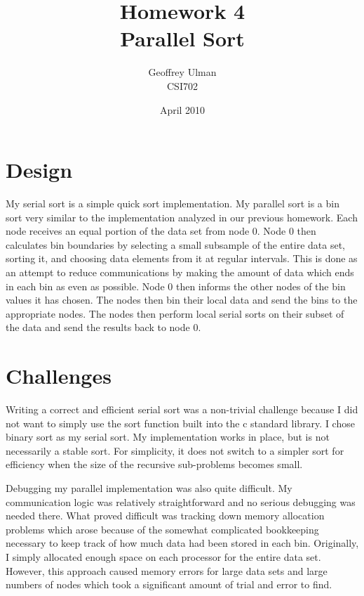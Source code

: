 \documentclass{article}
\begin{document}
\title{Homework 4\\
       Parallel Sort}
\author{Geoffrey Ulman\\
        CSI702}
\date{April 2010}
\maketitle

\section{Design}
My serial sort is a simple quick sort implementation. My parallel sort is a bin sort very similar to the implementation analyzed in our previous homework. Each node receives an equal portion of the data set from node 0. Node 0 then calculates bin boundaries by selecting a small subsample of the entire data set, sorting it, and choosing data elements from it at regular intervals. This is done as an attempt to reduce communications by making the amount of data which ends in each bin as even as possible. Node 0 then informs the other nodes of the bin values it has chosen. The nodes then bin their local data and send the bins to the appropriate nodes. The nodes then perform local serial sorts on their subset of the data and send the results back to node 0.

\section{Challenges}
Writing a correct and efficient serial sort was a non-trivial challenge because I did not want to simply use the sort function built into the c standard library. I chose binary sort as my serial sort. My implementation works in place, but is not necessarily a stable sort. For simplicity, it does not switch to a simpler sort for efficiency when the size of the recursive sub-problems becomes small.

Debugging my parallel implementation was also quite difficult. My communication logic was relatively straightforward and no serious debugging was needed there. What proved difficult was tracking down memory allocation problems which arose because of the somewhat complicated bookkeeping necessary to keep track of how much data had been stored in each bin. Originally, I simply allocated enough space on each processor for the entire data set. However, this approach caused memory errors for large data sets and large numbers of nodes which took a significant amount of trial and error to find.
\end{document}
